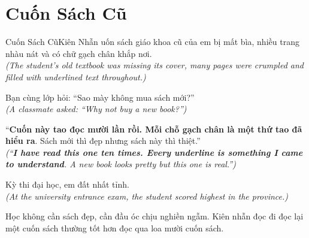 \section{Cuốn Sách Cũ}
\begin{truyen}{Cuốn Sách Cũ}{Kiên Nhẫn}
uốn sách giáo khoa cũ của em bị mất bìa, nhiều trang nhàu nát và có chữ gạch chân khắp nơi.\\
\textit{(The student's old textbook was missing its cover, many pages were crumpled and filled with underlined text throughout.)}

Bạn cùng lớp hỏi: ``Sao mày không mua sách mới?''\\
\textit{(A classmate asked: ``Why not buy a new book?'')}

``\textbf{Cuốn này tao đọc mười lần rồi. Mỗi chỗ gạch chân là một thứ tao đã hiểu ra}. Sách mới thì đẹp nhưng sách này thì thiệt.''\\
\textit{(``\textbf{I have read this one ten times. Every underline is something I came to understand}. A new book looks pretty but this one is real.'')}

Kỳ thi đại học, em đất nhất tỉnh.\\
\textit{(At the university entrance exam, the student scored highest in the province.)}
\end{truyen}
\begin{baihoc}
  Học không cần sách đẹp, cần đầu óc chịu nghiền ngẫm. Kiên nhẫn đọc đi đọc lại một cuốn sách thường tốt hơn đọc qua loa mười cuốn sách.
\end{baihoc}

